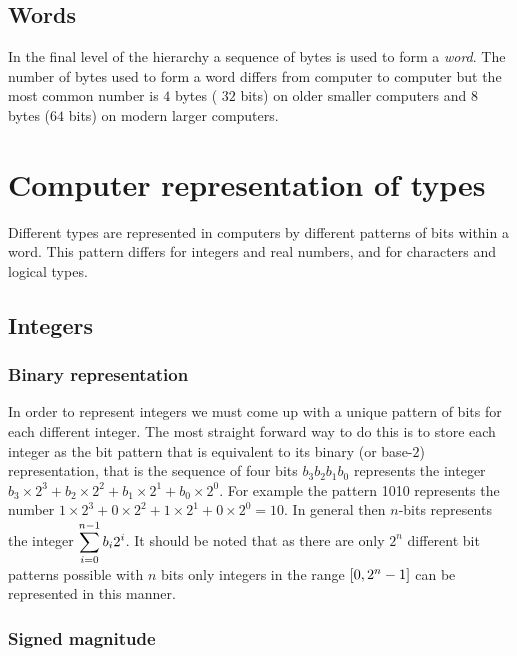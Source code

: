 \subsection{Words}

In the final level of the hierarchy a sequence of bytes is used to
form a \emph{word}. The number of bytes used to form a word differs
from computer to computer but the most common number is $4$ bytes (\ie
$32$ bits) on older smaller computers and $8$ bytes (\ie $64$ bits) on
modern larger computers.

\section{Computer representation of types}

Different types are represented in computers by different patterns of bits
within a word. This pattern differs for integers and real numbers, and for
characters and logical types.

\subsection{Integers}
\label{sec:CompAndNumericsIntegerRepresentation}

\subsubsection{Binary representation}

In order to represent integers we must come up with a unique pattern of bits
for each different integer. The most straight forward way to do this is to
store each integer as the bit pattern that is equivalent to its binary (or
base-$2$) representation, that is the sequence of four bits
$b_{3}b_{2}b_{1}b_{0}$ represents the integer $b_{3}\times 2^{3}+ b_{2}\times
2^{2} + b_{1}\times 2^{1} + b_{0} \times 2^{0}$. For example the pattern 1010
represents the number $1\times 2^{3}+ 0\times 2^{2} + 1\times 2^{1} + 0\times
2^{0} = 10$. In general then $n$-bits represents the integer
$ \displaystyle\sum _{i=0}^{n-1}b_{i}2^{i}$. It should be noted that as there are only
$2^{n}$ different bit patterns possible with $n$ bits only integers in
the range $\left[ 0,2^{n}-1 \right]$ can be represented in this manner.

\subsubsection{Signed magnitude}

